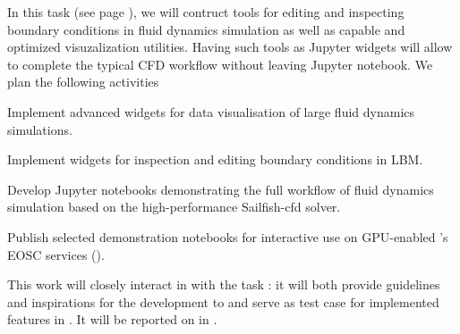 \begin{task}[
  title=Demonstrator: Visualisation and control of fluid dynamics in Jupyter notebook,
  id=application-gpu,
  lead=SIL,
  PM=12,
  wphases={4-36},
  partners={EGI}
]


In this task (see page \pageref{sec:concept-demonstrator-gpu}), we will contruct tools for editing and inspecting
boundary conditions in fluid dynamics simulation as well as capable and optimized visuzalization utilities. Having such tools as Jupyter widgets will allow to complete the  typical CFD workflow without leaving Jupyter notebook. We plan the following activities
\begin{compactitem}

\item Implement advanced widgets for data visualisation of large
  fluid dynamics simulations.
\item Implement widgets for inspection and editing boundary
  conditions in LBM.
\item Develop Jupyter notebooks demonstrating the full workflow of  fluid
  dynamics simulation based on the high-performance Sailfish-cfd solver.
  \item Publish selected demonstration notebooks for interactive use on
    GPU-enabled \TheProject's EOSC services ().
\end{compactitem}

This work will closely interact in with the task
: it will both provide guidelines and inspirations
for the development to  and serve
as test case for implemented features in
.
%
  It will be reported on in
  .
\end{task}
